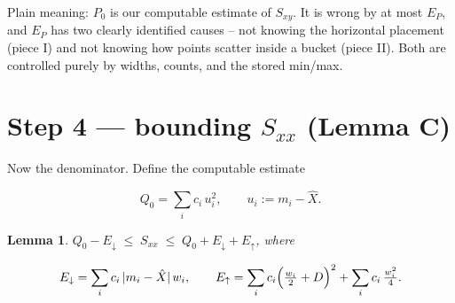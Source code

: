 \documentclass[11pt]{article}
\newtheorem{lemma}{Lemma}
\begin{document}
\noindent Plain meaning: $P_0$ is our computable estimate of $S_{xy}$.
It is wrong by at most $E_P$, and $E_P$ has two clearly identified
causes -- not knowing the horizontal placement (piece I) and not
knowing how points scatter inside a bucket (piece II). Both are
controlled purely by widths, counts, and the stored min/max.

\section{Step 4 --- bounding $S_{xx}$ (Lemma C)}

Now the denominator. Define the computable estimate

\[
Q_0=\sum_i c_i\,u_i^2,
\qquad u_i:=m_i-\hat X .
\]

\begin{lemma}\label{lem:C}
$Q_0-E_\downarrow\;\le\;S_{xx}\;\le\;Q_0+E_\downarrow+E_\uparrow$, where

\[
E_\downarrow=\sum_i c_i\,|m_i-\hat X|\,w_i,
\qquad
E_\uparrow=\sum_i c_i\Bigl(\tfrac{w_i}{2}+D\Bigr)^2
          +\sum_i c_i\,\tfrac{w_i^2}{4}.
\]
\end{lemma}
\end{document}
